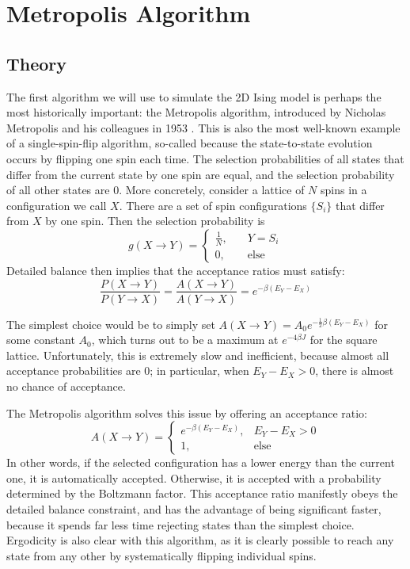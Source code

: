 \documentclass[twocolumn,aps]{revtex4-1} %
\begin{document}
\section{Metropolis Algorithm}
\subsection{Theory}
The first algorithm we will use to simulate the 2D Ising model is perhaps the most historically important: the Metropolis algorithm, introduced by Nicholas Metropolis and his colleagues in 1953 \cite{met}. This is also the most well-known example of a single-spin-flip algorithm, so-called because the state-to-state evolution occurs by flipping one spin each time. The selection probabilities of all states that differ from the current state by one spin are equal, and the selection probability of all other states are 0. More concretely, consider a lattice of $N$ spins in a configuration we call $X$. There are a set of spin configurations $\{S_i\}$ that differ from $X$ by one spin. Then the selection probability is
\begin{equation}
g(X \to Y) = \begin{cases}
\frac{1}{N},& \quad Y = S_i \\
0,& \quad \text{else}
\end{cases}
\end{equation}
Detailed balance then implies that the acceptance ratios must satisfy:
\begin{equation}
\frac{P(X \to Y)}{P(Y \to X)} = \frac{A(X \to Y)}{A(Y \to X)} = e^{-\beta(E_Y - E_X)}
\end{equation}

The simplest choice would be to simply set $A(X \to Y) = A_0e^{-\frac{1}{2}\beta(E_Y - E_X)}$ for some constant $A_0$, which turns out to be a maximum at $e^{-4\beta J}$ for the square lattice. Unfortunately, this is extremely slow and inefficient, because almost all acceptance probabilities are 0; in particular, when $E_Y - E_X > 0$, there is almost no chance of acceptance. 

The Metropolis algorithm solves this issue by offering an acceptance ratio:
\begin{equation}
A(X \to Y) = \begin{cases}
e^{-\beta(E_Y - E_X)}, & E_Y - E_X > 0 \\
1, & \text{else}
\end{cases}
\end{equation}
In other words, if the selected configuration has a lower energy than the current one, it is automatically accepted. Otherwise, it is accepted with a probability determined by the Boltzmann factor. This acceptance ratio manifestly obeys the detailed balance constraint, and has the advantage of being significant faster, because it spends far less time rejecting states than the simplest choice. Ergodicity is also clear with this algorithm, as it is clearly possible to reach any state from any other by systematically flipping individual spins.
\end{document}
